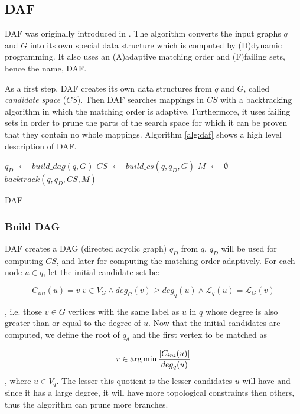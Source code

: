 \subsection{DAF}

DAF was originally introduced in . The algorithm converts the input graphs $q$ and $G$ 
into its own special data structure which is computed by (D)dynamic programming. It also uses an 
(A)adaptive matching order and (F)failing sets, hence the name, DAF.

As a first step, DAF creates its own data structures from $q$ and $G$, called \emph{candidate space} ($CS$).
Then DAF searches mappings in $CS$ with a backtracking algorithm in which the matching order is adaptive.
Furthermore, it uses failing sets in order to prune the parts of the search space for which it can be
proven that they contain no whole mappings. Algorithm \ref{alg:daf} shows a high level description of DAF.

\begin{algorithm}[h]
    \SetAlgoLined\DontPrintSemicolon
    \nl $q_D$ $\gets$ $build\_dag(q, G)$\;
    \nl $CS$ $\gets$ $build\_cs(q, q_D, G)$\;
    \nl $M$ $\gets$ $\emptyset$\;
    \nl $backtrack(q, q_D, CS, M)$\;
    \label{alg:daf}
    \caption{DAF}
\end{algorithm}

\subsubsection{Build DAG}

DAF creates a DAG (directed acyclic graph) $q_D$ from $q$. $q_D$ will be used for computing $CS$, and later
for computing the matching order adaptively. For each node $u \in q$, let the initial candidate set be:

\[ C_{ini}(u) = {v | v \in V_G \land deg_G(v) \geq deg_q(u) \land \mathcal{L}_q(u) = \mathcal{L}_G(v)} \]

, i.e. those $v \in G$ vertices with the same label as $u$ in $q$ whose degree is also greater than or 
equal to the degree of $u$. Now that the initial candidates are computed, we define the root of $q_d$
and the first vertex to be matched as

\[ r \in \operatorname*{arg\,min} \frac{|C_{ini}(u)|}{deg_q(u)} \], where $u \in V_q$. The lesser this quotient is the 
lesser candidates $u$ will have and since it has a large degree, it will have more topological constraints 
then others, thus the algorithm can prune more branches.

